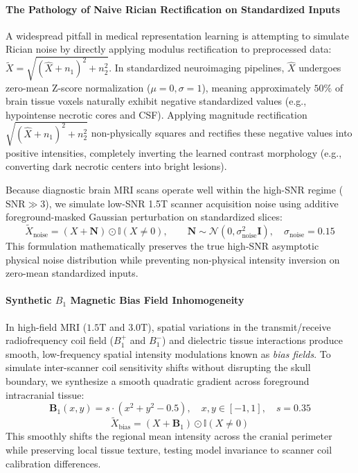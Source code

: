 \documentclass{article}
\begin{document}
\paragraph{The Pathology of Naive Rician Rectification on Standardized Inputs}
A widespread pitfall in medical representation learning is attempting to simulate Rician noise by directly applying modulus rectification to preprocessed data: $\tilde{X} = \sqrt{(\hat{X} + n_1)^2 + n_2^2}$. In standardized neuroimaging pipelines, $\hat{X}$ undergoes zero-mean Z-score normalization ($\mu = 0, \sigma = 1$), meaning approximately $50\%$ of brain tissue voxels naturally exhibit negative standardized values (e.g., hypointense necrotic cores and CSF). Applying magnitude rectification $\sqrt{(\hat{X} + n_1)^2 + n_2^2}$ non-physically squares and rectifies these negative values into positive intensities, completely inverting the learned contrast morphology (e.g., converting dark necrotic centers into bright lesions).

Because diagnostic brain MRI scans operate well within the high-SNR regime ($\text{SNR} \gg 3$), we simulate low-SNR 1.5T scanner acquisition noise using additive foreground-masked Gaussian perturbation on standardized slices:
\begin{equation}
    \tilde{X}_{\text{noise}} = \left( X + \mathbf{N} \right) \odot \mathbb{I}(X \neq 0), \qquad \mathbf{N} \sim \mathcal{N}(0, \sigma_{\text{noise}}^2 \mathbf{I}), \quad \sigma_{\text{noise}} = 0.15
\end{equation}
This formulation mathematically preserves the true high-SNR asymptotic physical noise distribution while preventing non-physical intensity inversion on zero-mean standardized inputs.

\paragraph{Synthetic $B_1$ Magnetic Bias Field Inhomogeneity}
In high-field MRI ($1.5\text{T}$ and $3.0\text{T}$), spatial variations in the transmit/receive radiofrequency coil field ($B_1^+$ and $B_1^-$) and dielectric tissue interactions produce smooth, low-frequency spatial intensity modulations known as \emph{bias fields}. To simulate inter-scanner coil sensitivity shifts without disrupting the skull boundary, we synthesize a smooth quadratic gradient across foreground intracranial tissue:
\begin{equation}
    \mathbf{B}_1(x, y) = s \cdot \left( x^2 + y^2 - 0.5 \right), \quad x, y \in [-1, 1], \quad s = 0.35
\end{equation}
\begin{equation}
    \tilde{X}_{\text{bias}} = \left( X + \mathbf{B}_1 \right) \odot \mathbb{I}(X \neq 0)
\end{equation}
This smoothly shifts the regional mean intensity across the cranial perimeter while preserving local tissue texture, testing model invariance to scanner coil calibration differences.
\end{document}
